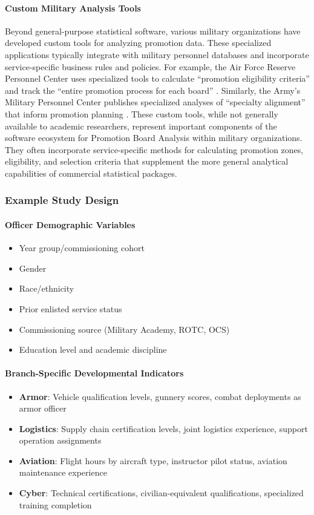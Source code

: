 \documentclass[../main.tex]{subfiles}
\begin{document}
\paragraph{Custom Military Analysis Tools}
Beyond general-purpose statistical software, various military organizations have developed custom tools for analyzing promotion data. These specialized applications typically integrate with military personnel databases and incorporate service-specific business rules and policies. For example, the Air Force Reserve Personnel Center uses specialized tools to calculate ``promotion eligibility criteria'' and track the ``entire promotion process for each board'' \citep{air_force_promotions}. Similarly, the Army's Military Personnel Center publishes specialized analyses of ``specialty alignment'' that inform promotion planning \citep{army_promotion_analysis}. These custom tools, while not generally available to academic researchers, represent important components of the software ecosystem for Promotion Board Analysis within military organizations. They often incorporate service-specific methods for calculating promotion zones, eligibility, and selection criteria that supplement the more general analytical capabilities of commercial statistical packages.

\subsubsection{Example Study Design}


\paragraph{Officer Demographic Variables}
\begin{itemize}
\item Year group/commissioning cohort
\item Gender
\item Race/ethnicity
\item Prior enlisted service status
\item Commissioning source (Military Academy, ROTC, OCS)
\item Education level and academic discipline
\end{itemize}

\paragraph{Branch-Specific Developmental Indicators}
\begin{itemize}
\item \textbf{Armor}: Vehicle qualification levels, gunnery scores, combat deployments as armor officer
\item \textbf{Logistics}: Supply chain certification levels, joint logistics experience, support operation assignments
\item \textbf{Aviation}: Flight hours by aircraft type, instructor pilot status, aviation maintenance experience
\item \textbf{Cyber}: Technical certifications, civilian-equivalent qualifications, specialized training completion
\end{itemize}
\end{document}

